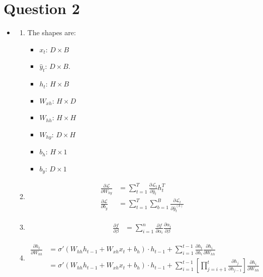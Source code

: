\documentclass{article}
\newcommand{\loss}{\mathcal{L}}
\newcommand{\pd}[2]{\frac{\partial #1}{\partial #2}}
\begin{document}
\section*{Question 2}
\begin{itemize}
    \item[(b)] 
        \begin{enumerate}[label=(\roman*)]
            \item The shapes are: \begin{itemize}
                \item $x_t$: $D \times B$
                \item $\hat{y}_t$: $D \times B$.
                \item $h_t$: $H \times B$
                \item $W_{xh}$: $H \times D$
                \item $W_{hh}$: $H \times H$
                \item $W_{hy}$: $D \times H$
                \item $b_h$: $H \times 1$
                \item $b_y$: $D \times 1$
            \end{itemize}
            \item \begin{align*}
                \pd{\loss}{W_{hy}} &= \sum\limits_{t=1}^T \pd{\loss_t}{\hat{y}_t} h_t^T\\
                \pd{\loss}{b_y} &= \sum\limits_{t=1}^T \sum\limits_{b=1}^B \pd{\loss_t}{\hat{y}_t^{(b)}}
            \end{align*}

            \item \begin{align*}
                \pd{f}{\beta} &= \sum_{i=1}^n \pd{f}{\alpha_i} \pd{\alpha_i}{\beta}
            \end{align*}

            \item \begin{align*}
                \pd{h_t}{W_{hh}} &= \sigma'(W_{hh} h_{t-1} + W_{xh} x_t + b_h) \cdot h_{t-1} + \sum_{i=1}^{t-1} \pd{h_t}{h_i} \pd{h_i}{W_{hh}}\\
                &= \sigma'(W_{hh} h_{t-1} + W_{xh} x_t + b_h) \cdot h_{t-1} + \sum_{i=1}^{t-1} \left[\prod_{j=i+1}^t \pd{h_j}{h_{j-1}} \right] \pd{h_i}{W_{hh}}
            \end{align*}


\end{enumerate}
\end{itemize}
\end{document}
